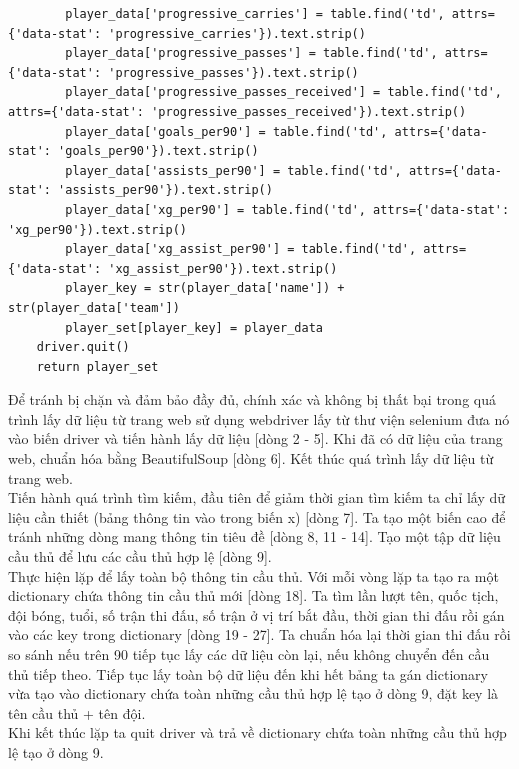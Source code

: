 \documentclass[12pt]{report}
\begin{document}
{\begin{lstlisting}
        player_data['progressive_carries'] = table.find('td', attrs={'data-stat': 'progressive_carries'}).text.strip()
        player_data['progressive_passes'] = table.find('td', attrs={'data-stat': 'progressive_passes'}).text.strip()
        player_data['progressive_passes_received'] = table.find('td', attrs={'data-stat': 'progressive_passes_received'}).text.strip()
        player_data['goals_per90'] = table.find('td', attrs={'data-stat': 'goals_per90'}).text.strip()
        player_data['assists_per90'] = table.find('td', attrs={'data-stat': 'assists_per90'}).text.strip()
        player_data['xg_per90'] = table.find('td', attrs={'data-stat': 'xg_per90'}).text.strip()
        player_data['xg_assist_per90'] = table.find('td', attrs={'data-stat': 'xg_assist_per90'}).text.strip()
        player_key = str(player_data['name']) + str(player_data['team'])
        player_set[player_key] = player_data
    driver.quit()
    return player_set
\end{lstlisting}
Để tránh bị chặn và đảm bảo đầy đủ, chính xác và không bị thất bại trong quá trình lấy dữ liệu từ trang web sử dụng webdriver lấy từ thư viện selenium đưa nó vào biến driver và tiến hành lấy dữ liệu [dòng 2 - 5]. Khi đã có dữ liệu của trang web, chuẩn hóa bằng BeautifulSoup [dòng 6]. Kết thúc quá trình lấy dữ liệu từ trang web.\\
Tiến hành quá trình tìm kiếm, đầu tiên để giảm thời gian tìm kiếm ta chỉ lấy dữ liệu cần thiết (bảng thông tin vào trong biến x) [dòng 7]. Ta tạo một biến cao để tránh những dòng mang thông tin tiêu đề [dòng 8, 11 - 14]. Tạo một tập dữ liệu cầu thủ để lưu các cầu thủ hợp lệ [dòng 9].\\
Thực hiện lặp để lấy toàn bộ thông tin cầu thủ. Với mỗi vòng lặp ta tạo ra một dictionary chứa thông tin cầu thủ mới [dòng 18]. Ta tìm lần lượt tên, quốc tịch, đội bóng, tuổi, số trận thi đấu, số trận ở vị trí bắt đầu, thời gian thi đấu rồi gán vào các key trong dictionary [dòng 19 - 27]. Ta chuẩn hóa lại thời gian thi đấu rồi so sánh nếu trên 90 tiếp tục lấy các dữ liệu còn lại, nếu không chuyển đến cầu thủ tiếp theo.
Tiếp tục lấy toàn bộ dữ liệu đến khi hết bảng ta gán dictionary vừa tạo vào dictionary chứa toàn những cầu thủ hợp lệ tạo ở dòng 9, đặt key là tên cầu thủ + tên đội.\\
Khi kết thúc lặp ta quit driver và trả về dictionary chứa toàn những cầu thủ hợp lệ tạo ở dòng 9.\\

}
\end{document}
